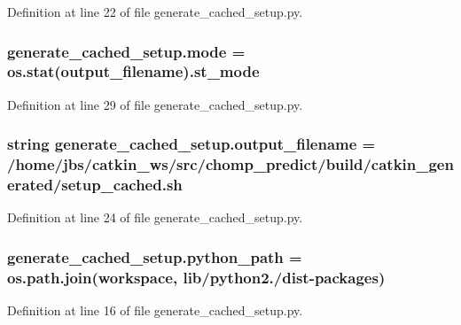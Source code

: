 Definition at line 22 of file generate\+\_\+cached\+\_\+setup.\+py.

\subsubsection[{\texorpdfstring{mode}{mode}}]{\setlength{\rightskip}{0pt plus 5cm}generate\+\_\+cached\+\_\+setup.\+mode = os.\+stat({\bf output\+\_\+filename}).st\+\_\+mode}\hypertarget{namespacegenerate__cached__setup_a10081e5abedae9bd46dd91202096e789}{}\label{namespacegenerate__cached__setup_a10081e5abedae9bd46dd91202096e789}


Definition at line 29 of file generate\+\_\+cached\+\_\+setup.\+py.

\subsubsection[{\texorpdfstring{output\+\_\+filename}{output_filename}}]{\setlength{\rightskip}{0pt plus 5cm}string generate\+\_\+cached\+\_\+setup.\+output\+\_\+filename = \textquotesingle{}/home/jbs/catkin\+\_\+ws/src/chomp\+\_\+predict/build/catkin\+\_\+generated/setup\+\_\+cached.\+sh\textquotesingle{}}\hypertarget{namespacegenerate__cached__setup_a0265aee5075ee1eb701ff69c98ad6793}{}\label{namespacegenerate__cached__setup_a0265aee5075ee1eb701ff69c98ad6793}


Definition at line 24 of file generate\+\_\+cached\+\_\+setup.\+py.

\subsubsection[{\texorpdfstring{python\+\_\+path}{python_path}}]{\setlength{\rightskip}{0pt plus 5cm}generate\+\_\+cached\+\_\+setup.\+python\+\_\+path = os.\+path.\+join(workspace, \textquotesingle{}lib/python2./dist-\/packages\textquotesingle{})}\hypertarget{namespacegenerate__cached__setup_a72579fd01529a79bab20d99291889d3f}{}\label{namespacegenerate__cached__setup_a72579fd01529a79bab20d99291889d3f}


Definition at line 16 of file generate\+\_\+cached\+\_\+setup.\+py.

